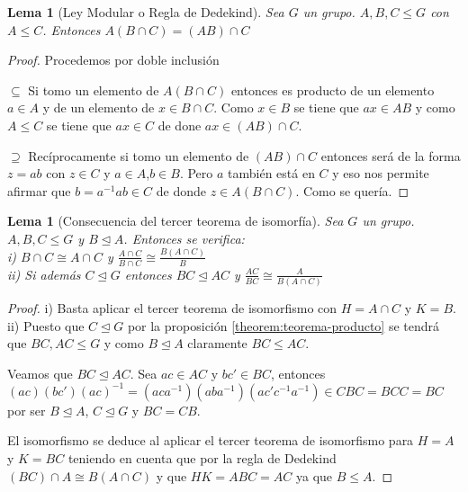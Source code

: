 \documentclass{article}
\theoremstyle{theorem-style}  %
\newtheorem{lemma}[theorem]{Lema}
\theoremstyle{definition-style}
\theoremstyle{example-style}
\begin{document}
\begin{lemma}[Ley Modular o Regla de Dedekind]
Sea $G$ un grupo. $A,B,C \le G$ con $A \le C$. Entonces $A(B \cap C) = (AB) \cap C$
\end{lemma}
\begin{proof}
Procedemos por doble inclusión

$\subseteq$ Si tomo un elemento de $A(B \cap C)$ entonces es producto de un elemento $a \in A$ y de un elemento de $x \in B \cap C$. Como $x \in B$ se tiene que $ax \in AB$ y como $A \le C$ se tiene que $ax \in C$ de done $ax \in (AB) \cap C$.

$\supseteq$ Recíprocamente si tomo un elemento de $(AB) \cap C$ entonces será de la forma $z = ab$ con $z \in C$ y $a \in A$,$b \in B$. Pero $a$ también está en $C$ y eso nos permite afirmar que $b = a^{-1}ab \in C$ de donde $z \in A(B \cap C)$. Como se quería.
\end{proof}

\begin{lemma}[Consecuencia del tercer teorema de isomorfía]\label{lemma:consecuencia-tercer-teorema-isomorfia}
Sea $G$ un grupo. $A,B,C \le G$ y $B \trianglelefteq A$. Entonces se verifica:\\
i) $B \cap C \cong A \cap C$ y $\frac{A \cap C}{B \cap C} \cong \frac{B(A \cap C)}{B}$\\
ii) Si además $C \trianglelefteq G$ entonces $BC \trianglelefteq AC$ y $\frac{AC}{BC} \cong \frac{A}{B(A \cap C)}$
\end{lemma}
\begin{proof}
i) Basta aplicar el tercer teorema de isomorfismo con $H = A \cap C$ y $K = B$.\\
ii) Puesto que $C \trianglelefteq G$ por la proposición \ref{theorem:teorema-producto} se tendrá que $BC,AC \le G$ y como $B \trianglelefteq A$ claramente $BC \le AC$.

Veamos que $BC \trianglelefteq AC$. Sea $ac \in AC$ y $bc' \in BC$, entonces $(ac)(bc')(ac)^{-1} = (aca^{-1})(aba^{-1})(ac'c^{-1}a^{-1}) \in CBC = BCC = BC$ por ser $B \trianglelefteq A$, $C \trianglelefteq G$ y $BC =CB$.

El isomorfismo se deduce al aplicar el tercer teorema de isomorfismo para $H = A$ y $K = BC$ teniendo en cuenta que por la regla de Dedekind $(BC) \cap A \cong B(A \cap C)$ y que $HK = ABC = AC$ ya que $B \le A$.
\end{proof}
\end{document}
